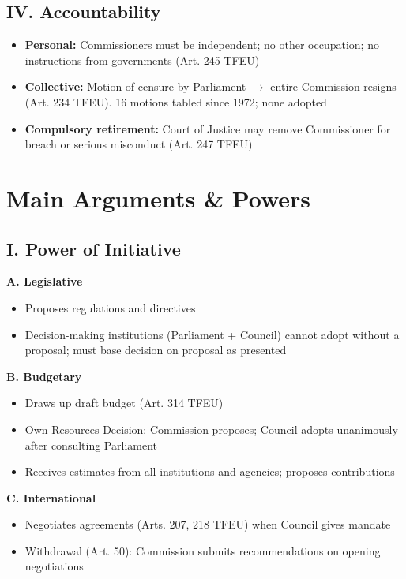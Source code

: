 \documentclass[11pt,a4paper]{article}
\begin{document}
\subsection*{IV. Accountability}

\begin{itemize}
\item \textbf{Personal:} Commissioners must be independent; no other occupation; no instructions from governments (Art. 245 TFEU)
\item \textbf{Collective:} Motion of censure by Parliament $\to$ entire Commission resigns (Art. 234 TFEU). 16 motions tabled since 1972; none adopted
\item \textbf{Compulsory retirement:} Court of Justice may remove Commissioner for breach or serious misconduct (Art. 247 TFEU)
\end{itemize}

\section*{Main Arguments \& Powers}

\subsection*{I. Power of Initiative}

\textbf{A. Legislative}
\begin{itemize}
\item Proposes regulations and directives
\item Decision-making institutions (Parliament + Council) cannot adopt without a proposal; must base decision on proposal as presented
\end{itemize}

\textbf{B. Budgetary}
\begin{itemize}
\item Draws up draft budget (Art. 314 TFEU)
\item Own Resources Decision: Commission proposes; Council adopts unanimously after consulting Parliament
\item Receives estimates from all institutions and agencies; proposes contributions
\end{itemize}

\textbf{C. International}
\begin{itemize}
\item Negotiates agreements (Arts. 207, 218 TFEU) when Council gives mandate
\item Withdrawal (Art. 50): Commission submits recommendations on opening negotiations
\end{itemize}
\end{document}
